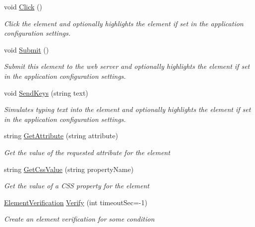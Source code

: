 \begin{DoxyCompactItemize}
void \hyperlink{class_proto_test_1_1_golem_1_1_web_driver_1_1_element_a0aaa9196593b063807069db139c34cc8}{Click} ()
\begin{DoxyCompactList}\small\item\em Click the element and optionally highlights the element if set in the application configuration settings. \end{DoxyCompactList}\item 
void \hyperlink{class_proto_test_1_1_golem_1_1_web_driver_1_1_element_a610b15316d94eba5e693fbbd1cee1440}{Submit} ()
\begin{DoxyCompactList}\small\item\em Submit this element to the web server and optionally highlights the element if set in the application configuration settings. \end{DoxyCompactList}\item 
void \hyperlink{class_proto_test_1_1_golem_1_1_web_driver_1_1_element_a46beac2cffb084d97bf7759622764c06}{Send\-Keys} (string text)
\begin{DoxyCompactList}\small\item\em Simulates typing text into the element and optionally highlights the element if set in the application configuration settings. \end{DoxyCompactList}\item 
string \hyperlink{class_proto_test_1_1_golem_1_1_web_driver_1_1_element_aab043d596b86ea3c6d4b92db98267a07}{Get\-Attribute} (string attribute)
\begin{DoxyCompactList}\small\item\em Get the value of the requested attribute for the element \end{DoxyCompactList}\item 
string \hyperlink{class_proto_test_1_1_golem_1_1_web_driver_1_1_element_a41883e9527a7e9bef791367fcbed327a}{Get\-Css\-Value} (string property\-Name)
\begin{DoxyCompactList}\small\item\em Get the value of a C\-S\-S property for the element \end{DoxyCompactList}\item 
\hyperlink{class_proto_test_1_1_golem_1_1_web_driver_1_1_element_verification}{Element\-Verification} \hyperlink{class_proto_test_1_1_golem_1_1_web_driver_1_1_element_a541592963d3f93a5aedd2e08c9dc48c5}{Verify} (int timeout\-Sec=-\/1)
\begin{DoxyCompactList}\small\item\em Create an element verification for some condition \end{DoxyCompactList}\item 

\end{DoxyCompactItemize}
